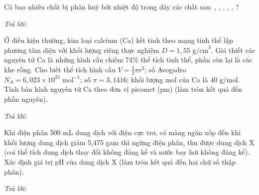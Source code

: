 \documentclass[11pt,a4paper]{article}
\def\loigiai#1{}
\begin{document}
\begin{ex}
Có bao nhiêu chất bị phân huỷ bởi nhiệt độ trong dãy các chất sau: , , , , , ?
\par\noindent\textit{Trả lời:} \dotfill
\loigiai{}
\end{ex}

\begin{ex}
Ở điều kiện thường, kim loại calcium (Ca) kết tinh theo mạng tinh thể lập phương tâm diện với khối lượng riêng thực nghiệm $D = 1{,}55\text{ g/cm}^3$. Giả thiết các nguyên tử Ca là những hình cầu chiếm 74\% thể tích tinh thể, phần còn lại là các khe rỗng. Cho biết thể tích hình cầu $V = \frac{4}{3}\pi r^3$; số Avogadro $N_A = 6{,}023\times 10^{23}\text{ mol}^{-1}$; số $\pi = 3{,}1416$; khối lượng mol của Ca là $40\text{ g/mol}$. Tính bán kính nguyên tử Ca theo đơn vị picomet (pm) (làm tròn kết quả đến phần nguyên).
\par\noindent\textit{Trả lời:} \dotfill
\loigiai{}
\end{ex}

\begin{ex}
Khi điện phân 500 mL dung dịch  với điện cực trơ, có màng ngăn xốp đến khi khối lượng dung dịch giảm 5,475 gam thì ngừng điện phân, thu được dung dịch X (coi thể tích dung dịch thay đổi không đáng kể và nước bay hơi không đáng kể). Xác định giá trị pH của dung dịch X (làm tròn kết quả đến hai chữ số thập phân).
\par\noindent\textit{Trả lời:} \dotfill
\loigiai{}
\end{ex}

\end{document}
